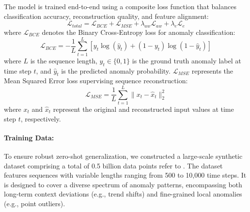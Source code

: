 \documentclass{article}
\theoremstyle{plain}
\theoremstyle{definition}
\theoremstyle{remark}
\begin{document}
The model is trained end-to-end using a composite loss function that balances classification accuracy, reconstruction quality, and feature alignment:
\begin{equation}
\mathcal{L}_{total} = \mathcal{L}_{BCE} + \mathcal{L}_{MSE} + \lambda_{aw} \mathcal{L}_{aw} + \lambda_{e} \mathcal{L}_{e}
\end{equation}
where $\mathcal{L}_{BCE}$ denotes the Binary Cross-Entropy loss for anomaly classification:
\begin{equation}
\mathcal{L}_{BCE} = - \frac{1}{L} \sum_{t=1}^{L} \left[ y_t \log(\hat{y}_t) + (1 - y_t) \log(1 - \hat{y}_t) \right]
\end{equation}
where $L$ is the sequence length, $y_t \in \{0,1\}$ is the ground truth anomaly label at time step $t$, and $\hat{y}_t$ is the predicted anomaly probability. $\mathcal{L}_{MSE}$ represents the Mean Squared Error loss supervising sequence reconstruction:
\begin{equation}
\mathcal{L}_{MSE} = \frac{1}{L} \sum_{t=1}^{L} \| x_t - \hat{x}_t \|_2^2
\end{equation}
where $x_t$ and $\hat{x}_t$ represent the original and reconstructed input values at time step $t$, respectively.

\paragraph{Training Data:} To ensure robust zero-shot generalization, we constructed a large-scale synthetic dataset comprising a total of 0.5 billion data points refer to \cite{lan2025foundationmodelszeroshottime}. The dataset features sequences with variable lengths ranging from 500 to 10,000 time steps. It is designed to cover a diverse spectrum of anomaly patterns, encompassing both long-term context deviations (e.g., trend shifts) and fine-grained local anomalies (e.g., point outliers).
\end{document}
